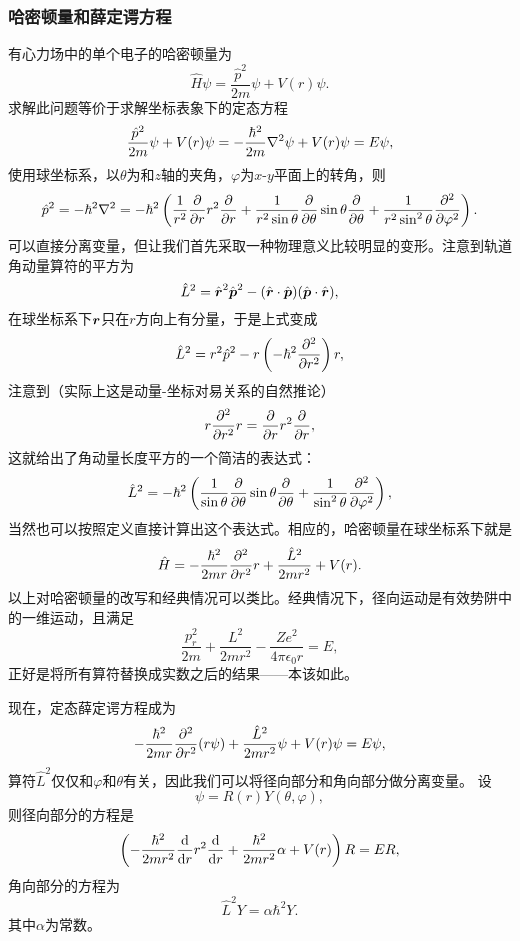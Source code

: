 \documentclass[UTF8, a4paper]{ctexart}
\begin{document}
\subsubsection{哈密顿量和薛定谔方程}

有心力场中的单个电子的哈密顿量为
\begin{equation}
    \hat{H} \psi = \frac{\hat{p}^2}{2m} \psi + V(r) \psi.
\end{equation}
求解此问题等价于求解坐标表象下的定态方程
\begin{equation}
    \frac{\hat{p}^2}{2m} \psi + V(r) \psi = - \frac{\hbar^2}{2m} \laplacian \psi + V(r) \psi = E \psi,
    \label{eq:centered-force-eq}
\end{equation}
使用球坐标系，以$\theta$为和$z$轴的夹角，$\varphi$为$x$-$y$平面上的转角，则
\[
    \hat{p}^2 = -\hbar^2 \laplacian = - \hbar^2 \left( \frac{1}{r^2} \pdv{r} r^2 \pdv{r} + \frac{1}{r^2 \sin \theta} \pdv{\theta} \sin \theta \pdv{\theta} + \frac{1}{r^2 \sin^2 \theta} \pdv[2]{\varphi} \right) .
\]
可以直接分离变量，但让我们首先采取一种物理意义比较明显的变形。注意到轨道角动量算符的平方为
\[
    \hat{L}^2 = \hat{\vb*{r}}^2 \hat{\vb*{p}}^2 - (\hat{\vb*{r}} \cdot \hat{\vb*{p}}) (\hat{\vb*{p}} \cdot \hat{\vb*{r}}),
\]
在球坐标系下$\vb*{r}$只在$r$方向上有分量，于是上式变成
\[
    \hat{L}^2 = r^2 \hat{p}^2 - r \left( - \hbar^2 \pdv[2]{r} \right) r,
\]
注意到（实际上这是动量-坐标对易关系的自然推论）
\[
    r \pdv[2]{r} r = \pdv{r} r^2 \pdv{r},
\]
这就给出了角动量长度平方的一个简洁的表达式：
\begin{equation}
    \hat{L}^2 = - \hbar^2 \left( \frac{1}{\sin \theta} \pdv{\theta} \sin \theta \pdv{\theta} + \frac{1}{\sin^2 \theta} \pdv[2]{\varphi} \right),
\end{equation}
当然也可以按照定义直接计算出这个表达式。相应的，哈密顿量在球坐标系下就是
\[
    \hat{H} = - \frac{\hbar^2}{2 m r} \pdv[2]{r} r + \frac{\hat{L}^2}{2 m r^2} + V(r).
\]
以上对哈密顿量的改写和经典情况可以类比。经典情况下，径向运动是有效势阱中的一维运动，且满足
\[
    \frac{p_r^2}{2m} + \frac{L^2}{2mr^2} - \frac{Ze^2}{4\pi \epsilon_0 r} = E,
\]
正好是将所有算符替换成实数之后的结果——本该如此。

现在，定态薛定谔方程成为
\[
    - \frac{\hbar^2}{2 m r} \pdv[2]{r} (r \psi) + \frac{\hat{L}^2}{2 m r^2} \psi + V(r) \psi = E \psi,
\]
算符$\hat{L}^2$仅仅和$\varphi$和$\theta$有关，因此我们可以将径向部分和角向部分做分离变量。
设
\[
    \psi = R(r) Y(\theta, \varphi),
\]
则径向部分的方程是
\begin{equation}
    \left( - \frac{\hbar^2}{2m r^2} \dv{r} r^2 \dv{r} + \frac{\hbar^2}{2m r^2} \alpha + V(r) \right) R = E R,
    \label{eq:original-r-equation}
\end{equation}
角向部分的方程为
\begin{equation}
    \hat{L}^2 Y = \alpha \hbar^2 Y.
    \label{eq:angle-equation}
\end{equation}
其中$\alpha$为常数。
\end{document}
